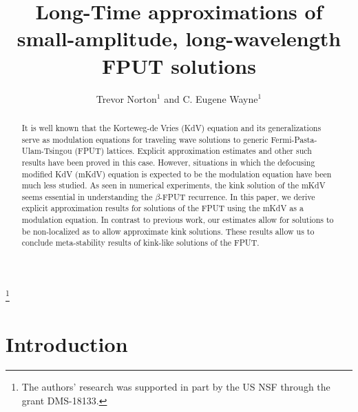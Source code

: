 \documentclass[oneside,reqno]{amsart}
\begin{document}
	
\title{Long-Time approximations of small-amplitude, long-wavelength FPUT solutions}

\author{Trevor Norton$^1$ and C. Eugene Wayne$^1$}
\address{$^1$Department of Mathematics and Statistics, Boston University, Boston, MA, United States}


\date{}
\thanks{The authors' research was supported in part by the US NSF through the grant DMS-18133.}



\begin{abstract}
It is well known that the Korteweg-de Vries (KdV) equation and its generalizations serve as modulation equations for traveling wave solutions to generic Fermi-Pasta-Ulam-Tsingou (FPUT) lattices. Explicit approximation estimates and other such results have been proved in this case. However, situations in which the defocusing modified KdV (mKdV) equation is expected to be the modulation equation have been much less studied. As seen in numerical experiments, the kink solution of the mKdV seems essential in understanding the \(\beta\)-FPUT recurrence. In this paper, we derive explicit approximation results for solutions of the FPUT using the mKdV as a modulation equation. In contrast to previous work, our estimates allow for solutions to be non-localized as to allow approximate kink solutions. These results allow us to conclude meta-stability results of kink-like solutions of the FPUT. 
\end{abstract}

\maketitle



\section{Introduction}
\end{document}
